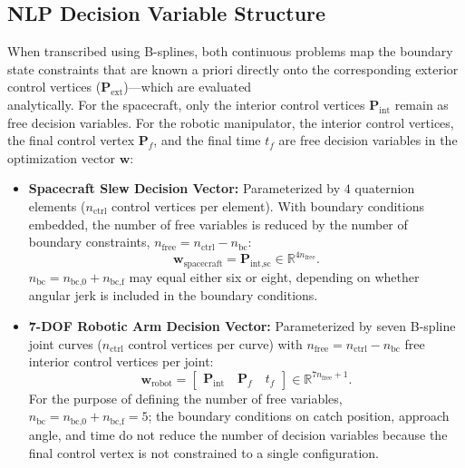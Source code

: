 \subsection{NLP Decision Variable Structure}
\label{sec:nlp_decision_variables}

When transcribed using B-splines, both continuous problems map the boundary state constraints that are known a priori directly onto the corresponding exterior control vertices ($\mathbf{P}_{\text{ext}}$)---which are evaluated \\ 
analytically. For the spacecraft, only the interior control vertices $\mathbf{P}_{\text{int}}$ remain as free decision variables. For the robotic manipulator, the interior control vertices, the final control vertex $\mathbf{P}_f$, and the final time $t_f$ are free decision variables in the optimization vector $\mathbf{w}$:

\begin{itemize}
    \item \textbf{Spacecraft Slew Decision Vector:} Parameterized by $4$ quaternion elements ($n_{\text{ctrl}}$ control vertices per element). 
    With boundary conditions embedded, the number of free variables is reduced by the number of boundary constraints, $n_{\text{free}} = n_{\text{ctrl}} - n_{\text{bc}}$:
    \begin{equation}
        \mathbf{w}_{\text{spacecraft}} = \mathbf{P}_{\text{int,sc}} \in \mathbb{R}^{4 n_{\text{free}}}.
    \end{equation}
    $n_{\text{bc}} = n_{\text{bc,0}} + n_{\text{bc,f}}$ may equal either six or eight, depending on whether angular jerk is included in the boundary conditions.
    \item \textbf{7-DOF Robotic Arm Decision Vector:} Parameterized by seven B-spline joint curves ($n_{\text{ctrl}}$ control vertices per curve) with $n_{\text{free}} = n_{\text{ctrl}} - n_{\text{bc}}$ free interior control vertices per joint:
    \begin{equation}
        \mathbf{w}_{\text{robot}} = 
        \begin{bmatrix} 
            \mathbf{P}_{\text{int}} \quad \mathbf{P}_f \quad t_f 
        \end{bmatrix} \in \mathbb{R}^{7 n_{\text{free}} + 1}.
    \end{equation}
    For the purpose of defining the number of free variables, $n_{\text{bc}} = n_{\text{bc,0}} + n_{\text{bc,f}} = 5$; the boundary conditions on catch position, approach angle, and time do not reduce the number of decision variables because the final control vertex is not constrained to a single configuration.
\end{itemize}

